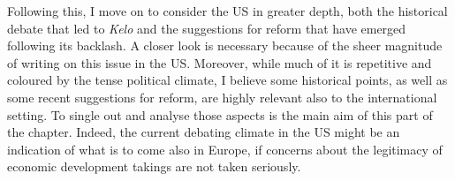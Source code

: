 Following this, I move on to consider the US in greater depth, both the historical debate that led to {\it Kelo} and the suggestions for reform that have emerged following its backlash. A closer look is necessary because of the sheer magnitude of writing on this issue in the US. Moreover, while much of it is repetitive and coloured by the tense political climate, I believe some historical points, as well as some recent suggestions for reform, are highly relevant also to the international setting. To single out and analyse those aspects is the main aim of this part of the chapter. Indeed, the current debating climate in the US might be an indication of what is to come also in Europe, if concerns about the legitimacy of economic development takings are not taken seriously.

%


